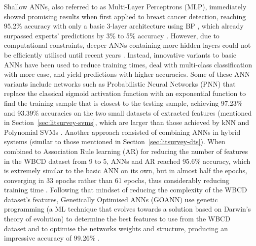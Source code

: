Shallow ANNs, also referred to as Multi-Layer Perceptrons (MLP), immediately showed promising results when first applied to breast cancer detection, reaching 95.2\% accuracy with only a basic 3-layer architecture using BP \citep{Wu1993}, which already surpassed experts' predictions by 3\% to 5\% accuracy \citep{Yue2018}. However, due to computational constraints, deeper ANNs containing more hidden layers could not be efficiently utilised until recent years \citep{Litjens2017}. Instead, innovative variants to basic ANNs have been used to reduce training times, deal with multi-class classification with more ease, and yield predictions  with higher accuracies. Some of these ANN variants include networks such as Probabilistic Neural Networks (PNN) that replace the classical sigmoid activation function with an exponential function to find the training sample that is closest to the testing sample, achieving 97.23\% and 93.39\% accuracies on the two small datasets of extracted features (mentioned in Section~\ref{sec:litsurvey-svms}, which are larger than those achieved by kNN and Polynomial SVMs \citep{Osareh2010}. Another approach consisted of combining ANNs in hybrid systems (similar to those mentioned in Section~\ref{sec:litsurvey-dts}). When combined to Association Rule learning (AR) for reducing the number of features in the WBCD dataset from 9 to 5, ANNs and AR reached 95.6\% accuracy, which is extremely similar to the basic ANN on its own, but in almost half the epochs, converging in 33 epochs rather than 61 epochs, thus considerably reducing training time \citep{Karabatak2009}. Following that mindset of reducing the complexity of the WBCD dataset's features, Genetically Optimised ANNs (GOANN) use genetic programming (a ML technique that evolves towards a solution based on Darwin's theory of evolution) to determine the best features to use from the WBCD dataset and to optimise the networks weights and structure, producing an impressive accuracy of 99.26\% \citep{Bhardwaj2015}.



